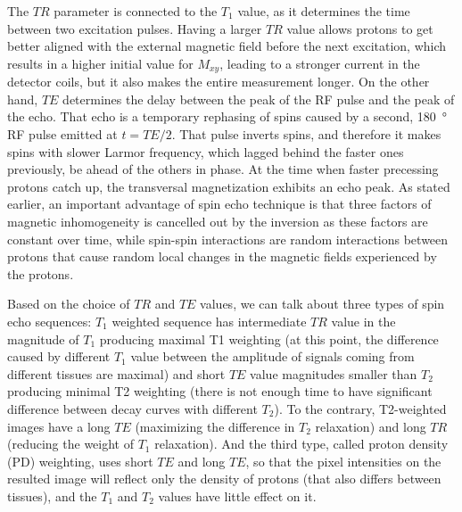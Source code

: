 The $TR$ parameter is connected to the $T_1$ value, as it determines the time between two excitation pulses. Having a larger $TR$ value allows protons to get better aligned with the external magnetic field before the next excitation, which results in a higher initial value for $M_{xy}$, leading to a stronger current in the detector coils, but it also makes the entire measurement longer. On the other hand, $TE$ determines the delay between the peak of the RF pulse and the peak of the echo. That echo is a temporary rephasing of spins caused by a second, \SI{180}{\degree} RF pulse emitted at $t = TE/2$. That pulse inverts spins, and therefore it makes spins with slower Larmor frequency, which lagged behind the faster ones previously, be ahead of the others in phase. At the time when faster precessing protons catch up, the transversal magnetization exhibits an echo peak. As stated earlier, an important advantage of spin echo technique is that three factors of magnetic inhomogeneity is cancelled out by the inversion as these factors are constant over time, while spin-spin interactions are random interactions between protons that cause random local changes in the magnetic fields experienced by the protons.

Based on the choice of $TR$ and $TE$ values, we can talk about three types of spin echo sequences: $T_1$ weighted sequence has intermediate $TR$ value in the magnitude of $T_1$ producing maximal T1 weighting (at this point, the difference caused by different $T_1$ value between the amplitude of signals coming from different tissues are maximal) and short $TE$ value magnitudes smaller than $T_2$ producing minimal T2 weighting (there is not enough time to have significant difference between decay curves with different $T_2$). To the contrary, T2-weighted images have a long $TE$ (maximizing the difference in $T_2$ relaxation) and long $TR$ (reducing the weight of $T_1$ relaxation). And the third type, called proton density (PD) weighting, uses short $TE$ and long $TE$, so that the pixel intensities on the resulted image will reflect only the density of protons (that also differs between tissues), and the $T_1$ and $T_2$ values have little effect on it.

\clearpage